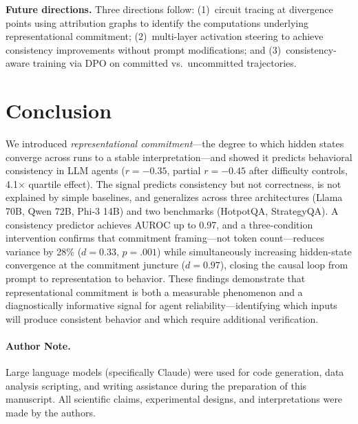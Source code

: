 \documentclass{article}
\begin{document}
\textbf{Future directions.} Three directions follow: (1)~circuit tracing at divergence points using attribution graphs \citep{anthropic_circuits} to identify the computations underlying representational commitment; (2)~multi-layer activation steering to achieve consistency improvements without prompt modifications; and (3)~consistency-aware training via DPO on committed vs.\ uncommitted trajectories.

\section{Conclusion}

We introduced \emph{representational commitment}---the degree to which hidden states converge across runs to a stable interpretation---and showed it predicts behavioral consistency in LLM agents ($r = -0.35$, partial $r = -0.45$ after difficulty controls, 4.1$\times$ quartile effect). The signal predicts consistency but not correctness, is not explained by simple baselines, and generalizes across three architectures (Llama 70B, Qwen 72B, Phi-3 14B) and two benchmarks (HotpotQA, StrategyQA). A consistency predictor achieves AUROC up to 0.97, and a three-condition intervention confirms that commitment framing---not token count---reduces variance by 28\% ($d = 0.33$, $p = .001$) while simultaneously increasing hidden-state convergence at the commitment juncture ($d = 0.97$), closing the causal loop from prompt to representation to behavior. These findings demonstrate that representational commitment is both a measurable phenomenon and a diagnostically informative signal for agent reliability---identifying which inputs will produce consistent behavior and which require additional verification.


\paragraph{Author Note.} Large language models (specifically Claude) were used for code generation, data analysis scripting, and writing assistance during the preparation of this manuscript. All scientific claims, experimental designs, and interpretations were made by the authors.
\end{document}
